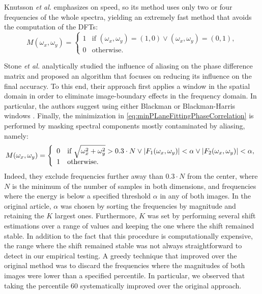 Knutsson \emph{et al.} \cite{Knutsson2005} emphasizes on speed, so its method uses only two or four frequencies of the whole spectra, yielding an extremely fast method that avoids the computation of the DFTs:
\begin{equation}
	M(\omega_x, \omega_y)= \left\{ \begin{array}{ll}
             1 &   \text{if } (\omega_x, \omega_y)\!=\!(1,0) \vee (\omega_x, \omega_y)\!=\!(0,1), \\
             0 &  \text{otherwise}.
             \end{array}
   \right.
\end{equation}

Stone \emph{et al.} \cite{Stone_2001} analytically studied the influence of aliasing on the phase difference matrix and proposed an algorithm that focuses on reducing its influence on the final accuracy. To this end, their approach first applies a window in the spatial domain in order to eliminate image-boundary effects in the frequency domain. In particular, the authors suggest using either Blackman or Blackman-Harris windows \cite{SASPWEB2011}. Finally, the minimization in \eqref{eq:minPLaneFittingPhaseCorrelation} is performed by masking spectral components mostly contaminated by aliasing, namely:
\begin{equation}
	M(\omega_x, \omega_y)= \left\{ \begin{array}{ll}
             0 &   \text{if } \sqrt{\omega_x^2+\omega_y^2} > 0.3 \cdot N \vee \left\lvert F_1(\omega_x, \omega_y)\right\rvert < \alpha \vee \left\lvert F_2(\omega_x, \omega_y)\right\rvert < \alpha, \\
             1 &  \text{otherwise}.
             \end{array}
   \right.
\end{equation}
Indeed, they exclude frequencies further away than $0.3 \cdot N$ from the center, where $N$ is the minimum of the number of samples in both dimensions, and frequencies where the energy is below a specified threshold $\alpha$ in any of both images. In the original article, $\alpha$ was chosen by sorting the frequencies by magnitude and retaining the $K$ largest ones. Furthermore, $K$ was set by performing several shift estimations over a range of values and keeping the one where the shift remained stable. In addition to the fact that this procedure is computationally expensive, the range where the shift remained stable was not always straightforward to detect in our empirical testing. A greedy technique that improved over the original method was to discard the frequencies where the magnitudes of both images were lower than a specified percentile. In particular, we observed that taking the percentile 60 systematically improved over the original approach. 


